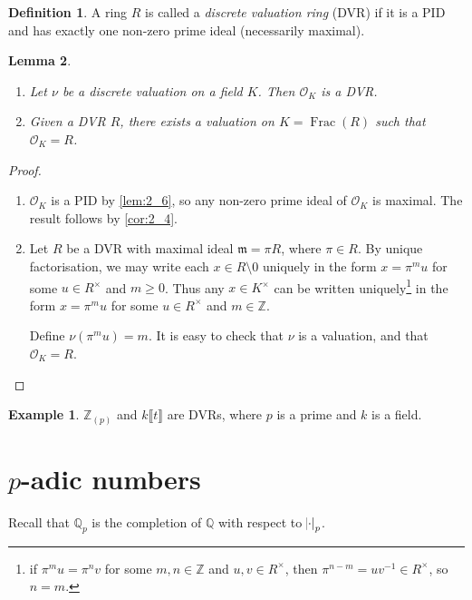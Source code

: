 \documentclass[12pt]{amsart}
\theoremstyle{definition}
\newtheorem{definition}{Definition}[section]
\newtheorem*{example}{Example}
\theoremstyle{plain}
\newtheorem{lemma}[definition]{Lemma}
\theoremstyle{remark}
\DeclareMathOperator{\Frac}{\mathrm{Frac}}
\newcommand{\bZ}{\mathbb{Z}}
\newcommand{\bQ}{\mathbb{Q}}
\newcommand{\cO}{\mathcal{O}}
\newcommand{\fm}{\mathfrak{m}}
\begin{document}
\begin{definition}
    A ring $R$ is called a \emph{discrete valuation ring} (DVR) if it is a PID and has exactly one non-zero prime ideal (necessarily maximal).
\end{definition}

\begin{lemma}\label{lem:2_8}\phantom{}
    \begin{enumerate}
        \item Let $\nu$ be a discrete valuation on a field $K$. Then $\cO_K$ is a DVR.
        \item Given a DVR $R$, there exists a valuation on $K = \Frac(R)$ such that $\cO_K = R$.
    \end{enumerate}
\end{lemma}
\begin{proof}\phantom{}
    \begin{enumerate}
        \item $\cO_K$ is a PID by \autoref{lem:2_6}, so any non-zero prime ideal of $\cO_K$ is maximal. The result follows by \autoref{cor:2_4}.

        \item Let $R$ be a DVR with maximal ideal $\fm = \pi R$, where $\pi \in R$. By unique factorisation, we may write each $x \in R \setminus 0$ uniquely in the form $x = \pi^m u$ for some $u \in R^\times$ and $m \ge 0$. Thus any $x \in K^\times$ can be written uniquely\footnote{if $\pi^m u = \pi^n v$ for some $m, n \in \bZ$ and $u, v \in R^\times$, then $\pi^{n-m} = u v^{-1} \in R^\times$, so $n = m$.} in the form $x = \pi^m u$ for some $u \in R^\times$ and $m \in \bZ$.

        Define $\nu(\pi^m u) = m$. It is easy to check that $\nu$ is a valuation, and that $\cO_K = R$. \qedhere
    \end{enumerate}
\end{proof}

\begin{example}
    $\bZ_(p)$ and $k \llbracket t \rrbracket$ are DVRs, where $p$ is a prime and $k$ is a field.
\end{example}

\section{\texorpdfstring{$p$}{p}-adic numbers}

\noindent Recall that $\bQ_p$ is the completion of $\bQ$ with respect to $\abs{\cdot}_p$.
\end{document}
